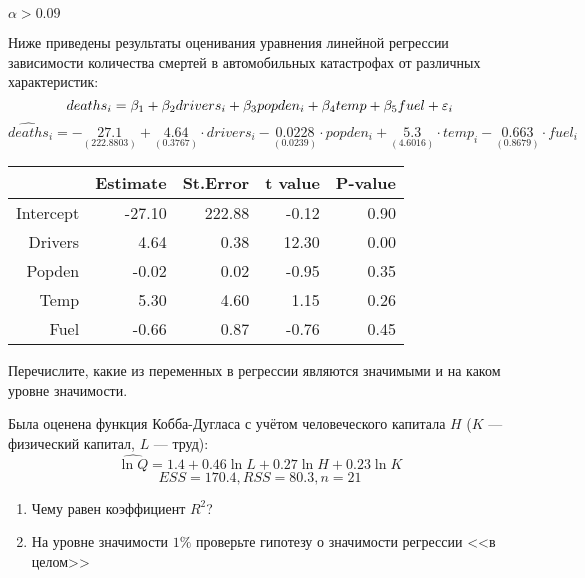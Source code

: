 \documentclass[pdftex,11pt,openany]{book}\usepackage[]{graphicx}\usepackage[]{color}
\begin{document}
\begin{solution}
$\alpha>0.09$
\end{solution}


\begin{problem}
 Ниже приведены результаты оценивания уравнения линейной регрессии зависимости количества смертей в автомобильных катастрофах от различных характеристик:
\[
deaths_i = \beta_1 + \beta_2 drivers_i + \beta_3 popden_i + \beta_4  temp + \beta_5 fuel + \varepsilon_i
\]
\ensuremath{\widehat{deaths}_i=-\underset{(222.8803)}{27.1}+\underset{(  0.3767)}{4.64}\cdot drivers_i-\underset{(  0.0239)}{0.0228}\cdot popden_i+\underset{(  4.6016)}{5.3}\cdot temp_i-\underset{(  0.8679)}{0.663}\cdot fuel_i}%
\begin{table}[ht]
\centering
\begin{tabular}{rrrrr}
  \hline
 & Estimate & St.Error & t value & P-value \\ 
  \hline
Intercept & -27.10 & 222.88 & -0.12 & 0.90 \\ 
  Drivers & 4.64 & 0.38 & 12.30 & 0.00 \\ 
  Popden & -0.02 & 0.02 & -0.95 & 0.35 \\ 
  Temp & 5.30 & 4.60 & 1.15 & 0.26 \\ 
  Fuel & -0.66 & 0.87 & -0.76 & 0.45 \\ 
   \hline
\end{tabular}
\end{table}

Перечислите, какие из переменных в регрессии являются значимыми и на каком уровне значимости.
\end{problem}

\begin{solution}
\end{solution}


\begin{problem}
 Была оценена функция Кобба-Дугласа с учётом человеческого капитала $H$ ($K$ --- физический капитал, $L$ --- труд): 
\[ 
\widehat{\ln Q} = 1.4 + 0.46\ln L + 0.27\ln H + 0.23\ln K
\] 
\[
ESS = 170.4, RSS = 80.3, n = 21
\]
\begin{enumerate}
\item Чему равен коэффициент $R^2$?
\item На уровне значимости $1\%$ проверьте гипотезу о значимости регрессии <<в целом>>
\end{enumerate}
\end{problem}
\end{document}
